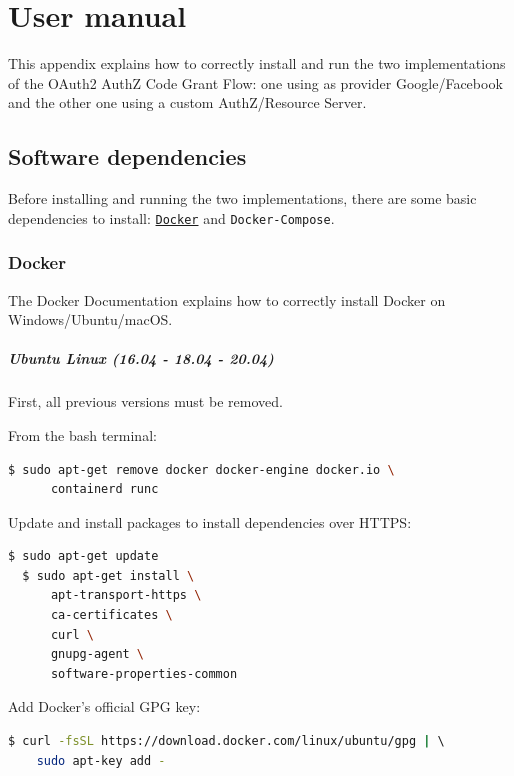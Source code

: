 \appendix
\chapter{User manual}
This appendix explains how to correctly install and run the two implementations of the OAuth2 AuthZ Code Grant Flow: one using as provider Google/Facebook and the other one using a custom AuthZ/Resource Server.

\minitoc

\section{Software dependencies}
\label{appa}
Before installing and running the two implementations, there are some basic dependencies to install: \href{https://www.docker.com/}{\texttt{Docker}} and \texttt{Docker-Compose}.

\subsection{Docker}
\label{ublin}
The Docker Documentation \cite{docker} explains how to correctly install Docker on Windows/Ubuntu/macOS.

\paragraph{Ubuntu Linux (16.04 - 18.04 - 20.04)} First, all previous versions must be removed. 

\noindent From the bash terminal:
\begin{lstlisting}[language=bash]
  $ sudo apt-get remove docker docker-engine docker.io \
      containerd runc
\end{lstlisting}

\noindent Update and install packages to install dependencies over HTTPS:
\begin{lstlisting}[language=bash]
  $ sudo apt-get update
  $ sudo apt-get install \
      apt-transport-https \
      ca-certificates \
      curl \
      gnupg-agent \
      software-properties-common
\end{lstlisting}

\noindent Add Docker’s official GPG key:
\begin{lstlisting}[language=bash, showstringspaces=false, basicstyle=\ttfamily]
  $ curl -fsSL https://download.docker.com/linux/ubuntu/gpg | \ 
    sudo apt-key add -
\end{lstlisting}

